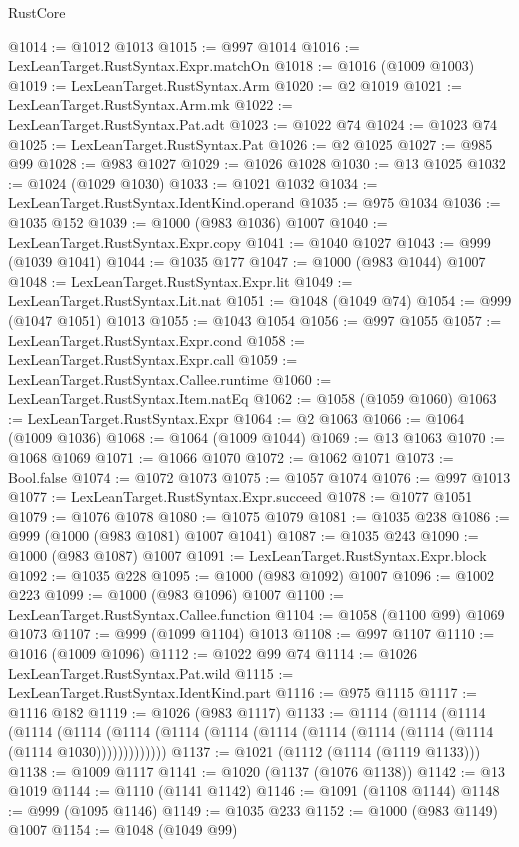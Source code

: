 \begin{lexlean}{RustCore}
\begin{coremodule}
@1014 := @1012 @1013
@1015 := @997 @1014
@1016 := LexLeanTarget.RustSyntax.Expr.matchOn
@1018 := @1016 (@1009 @1003)
@1019 := LexLeanTarget.RustSyntax.Arm
@1020 := @2 @1019
@1021 := LexLeanTarget.RustSyntax.Arm.mk
@1022 := LexLeanTarget.RustSyntax.Pat.adt
@1023 := @1022 @74
@1024 := @1023 @74
@1025 := LexLeanTarget.RustSyntax.Pat
@1026 := @2 @1025
@1027 := @985 @99
@1028 := @983 @1027
@1029 := @1026 @1028
@1030 := @13 @1025
@1032 := @1024 (@1029 @1030)
@1033 := @1021 @1032
@1034 := LexLeanTarget.RustSyntax.IdentKind.operand
@1035 := @975 @1034
@1036 := @1035 @152
@1039 := @1000 (@983 @1036) @1007
@1040 := LexLeanTarget.RustSyntax.Expr.copy
@1041 := @1040 @1027
@1043 := @999 (@1039 @1041)
@1044 := @1035 @177
@1047 := @1000 (@983 @1044) @1007
@1048 := LexLeanTarget.RustSyntax.Expr.lit
@1049 := LexLeanTarget.RustSyntax.Lit.nat
@1051 := @1048 (@1049 @74)
@1054 := @999 (@1047 @1051) @1013
@1055 := @1043 @1054
@1056 := @997 @1055
@1057 := LexLeanTarget.RustSyntax.Expr.cond
@1058 := LexLeanTarget.RustSyntax.Expr.call
@1059 := LexLeanTarget.RustSyntax.Callee.runtime
@1060 := LexLeanTarget.RustSyntax.Item.natEq
@1062 := @1058 (@1059 @1060)
@1063 := LexLeanTarget.RustSyntax.Expr
@1064 := @2 @1063
@1066 := @1064 (@1009 @1036)
@1068 := @1064 (@1009 @1044)
@1069 := @13 @1063
@1070 := @1068 @1069
@1071 := @1066 @1070
@1072 := @1062 @1071
@1073 := Bool.false
@1074 := @1072 @1073
@1075 := @1057 @1074
@1076 := @997 @1013
@1077 := LexLeanTarget.RustSyntax.Expr.succeed
@1078 := @1077 @1051
@1079 := @1076 @1078
@1080 := @1075 @1079
@1081 := @1035 @238
@1086 := @999 (@1000 (@983 @1081) @1007 @1041)
@1087 := @1035 @243
@1090 := @1000 (@983 @1087) @1007
@1091 := LexLeanTarget.RustSyntax.Expr.block
@1092 := @1035 @228
@1095 := @1000 (@983 @1092) @1007
@1096 := @1002 @223
@1099 := @1000 (@983 @1096) @1007
@1100 := LexLeanTarget.RustSyntax.Callee.function
@1104 := @1058 (@1100 @99) @1069 @1073
@1107 := @999 (@1099 @1104) @1013
@1108 := @997 @1107
@1110 := @1016 (@1009 @1096)
@1112 := @1022 @99 @74
@1114 := @1026 LexLeanTarget.RustSyntax.Pat.wild
@1115 := LexLeanTarget.RustSyntax.IdentKind.part
@1116 := @975 @1115
@1117 := @1116 @182
@1119 := @1026 (@983 @1117)
@1133 := @1114
    (@1114
      (@1114
        (@1114
          (@1114 (@1114 (@1114 (@1114 (@1114 (@1114 (@1114 (@1114 (@1114 (@1114 @1030)))))))))))))
@1137 := @1021 (@1112 (@1114 (@1119 @1133)))
@1138 := @1009 @1117
@1141 := @1020 (@1137 (@1076 @1138))
@1142 := @13 @1019
@1144 := @1110 (@1141 @1142)
@1146 := @1091 (@1108 @1144)
@1148 := @999 (@1095 @1146)
@1149 := @1035 @233
@1152 := @1000 (@983 @1149) @1007
@1154 := @1048 (@1049 @99)

\end{coremodule}
\end{lexlean}
